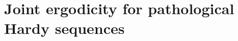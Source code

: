 \documentclass[11pt]{amsart}
\theoremstyle{definition}
\newcommand{\norm}[1]{\left\Vert #1\right\Vert}
\newcommand{\1}{{\mathbf{1}}}
\newcommand{\floor}[1]{{\left \lfloor #1 \right \rfloor}}
\begin{document}



\fi

\section{Joint ergodicity for pathological Hardy sequences}\label{section: repaired conjecture}
\end{document}
